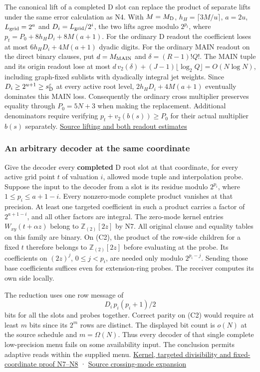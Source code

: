 \documentclass[
  11pt,
]{article}
\begin{document}
The canonical lift of a completed D slot can replace the product of
separate lifts under the same error calculation as N4. With
\(M=M_{\rm D}\), \(h_H=\lceil3M/u\rceil\), \(a=2u\),
\(L_{\rm grid}=2^a\) and \(D_i=L_{\rm grid}/2^i\), the two lifts agree
modulo \(2^{p_t}\), where \(p_t=P_0+8h_HD_i+8M(a+1)\). For the ordinary
D readout the coefficient loses at most \(6h_HD_i+4M(a+1)\) dyadic
digits. For the ordinary MAIN readout on the direct binary clauses, put
\(d=M_{\rm MAIN}\) and \(\delta=(R-1)!Q!\). The MAIN tuple and its
origin readout lose at most
\(d\,v_2(\delta)+(J-1)\lfloor\log_2 Q\rfloor=O(N\log N)\), including
graph-fixed sublists with dyadically integral jet weights. Since
\(D_i\ge 2^{u+1}\ge s_{\rm D}^{\varepsilon}\) at every active root
level, \(2h_HD_i+4M(a+1)\) eventually dominates this MAIN loss.
Consequently the ordinary cross multiplier preserves equality through
\(P_0=5N+3\) when making the replacement. Additional denominators
require verifying \(p_t+v_2(b(s))\ge P_0\) for their actual multiplier
\(b(s)\) separately. \hyperref[v8-section-native-escape]{Source lifting and
both readout estimates}

\subsubsection{An arbitrary decoder at the same
coordinate}\label{v8-an-arbitrary-decoder-at-the-same-coordinate}

Give the decoder every \textbf{completed} D root slot at that
coordinate, for every active grid point \(t\) of valuation \(i\),
allowed mode tuple and interpolation probe. Suppose the input to the
decoder from a slot is its residue modulo \(2^{p_i}\), where
\(1\le p_i\le a+1-i\). Every nonzero-mode complete product vanishes at
that precision. At least one targeted coefficient in such a product
carries a factor of \(2^{a+1-i}\), and all other factors are integral.
The zero-mode kernel entries \(W_{xy}(t+\alpha z)\) belong to
\(\mathbb Z_{(2)}[2z]\) by N7. All original clause and equality tables
on this family are binary. On (C2), the product of the row-side children
for a fixed \(t\) therefore belongs to \(\mathbb Z_{(2)}[2z]\) before
evaluating at the probe. Its coefficients on \((2z)^j\), \(0\le j<p_i\),
are needed only modulo \(2^{p_i-j}\). Sending those base coefficients
suffices even for extension-ring probes. The receiver computes its own
side locally.

The reduction uses one row message of \[
                       D_i\,p_i(p_i+1)/2
\] bits for all the slots and probes together. Correct parity on (C2)
would require at least \(m\) bits since its \(2^m\) rows are distinct.
The displayed bit count is \(o(N)\) at the source schedule and
\(m=\Omega(N)\). Thus every decoder of that single complete
low-precision menu fails on some availability input. The conclusion
permits adaptive reads within the supplied menu.
\hyperref[v8-section-native-escape]{Kernel, targeted divisibility and
fixed-coordinate proof N7--N8} ·
\href{https://github.com/openai/math/blob/main/preprints/The-Exponential-Time-Hypothesis-is-False-October-25-2026/build/quantitative-contraction.tex\#L402}{Source
crossing-mode expansion}
\end{document}
